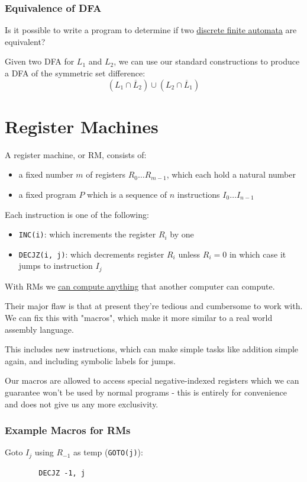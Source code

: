 \documentclass{article}
\begin{document}
\subsubsection{Equivalence of DFA}
Is it possible to write a program to determine if two \hyperref[dfa]{discrete finite automata} are equivalent?

Given two DFA for $L_1$ and $L_2$, we can use our standard constructions to produce a DFA of the symmetric set difference:
\[(L_1 \cap \overline L_2) \cup (L_2 \cap \overline L_1)\]

\newpage

\section{Register Machines}\label{rm}
A register machine, or RM, consists of:
\begin{itemize}
    \item a fixed number $m$ of registers $R_0 \dots R_{m-1}$, which each hold a natural number
    \item a fixed program $P$ which is a sequence of $n$ instructions $I_0 \dots I_{n-1}$
\end{itemize}

Each instruction is one of the following:
\begin{itemize}
    \item \texttt{INC(i)}: which increments the register $R_i$ by one
    \item \texttt{DECJZ(i, j)}: which decrements register $R_i$ unless $R_i = 0$ in which case it jumps to instruction $I_j$
\end{itemize}

With RMs we \hyperref[universality]{can compute anything} that another computer can compute. 

Their major flaw is that at present they're tedious and cumbersome to work with. We can fix this with "macros", which make it more similar to a real world assembly language.

This includes new instructions, which can make simple tasks like addition simple again, and including symbolic labels for jumps.

Our macros are allowed to access special negative-indexed registers which we can guarantee won't be used by normal programs - this is entirely for convenience and does not give us any more exclusivity.

\subsubsection{Example Macros for RMs}
Goto $I_j$ using $R_{-1}$ as temp (\texttt{GOTO(j)}):
\begin{lstlisting}
        DECJZ -1, j
\end{lstlisting}
\end{document}
